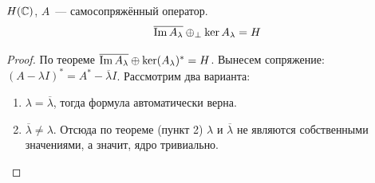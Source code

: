 \begin{theorem}[11.2]\label{11.2}
    $H(\mathbb{C})$, $A$~--- самосопряжённый оператор.
    \[
    \overline{\operatorname{Im} A_{\lambda}} \oplus_{\perp} \ker A_{\lambda} = H
    \]
\end{theorem}

\begin{proof}
    По теореме  $\overline{\operatorname{Im} A_\lambda} \oplus \ker (A_\lambda)^*=H$.
    Вынесем сопряжение: $(A - \lambda I)^* = A^* - \overline{\lambda} I$.
    Рассмотрим два варианта:
    \begin{enumerate}
        \item[$\lambda \in \R\!: $]
        $\lambda = \overline{\lambda}$, тогда формула автоматически верна.
        \item[$\lambda \not\in \R\!: $]
        $\overline{\lambda} \neq \lambda$. Отсюда по теореме  (пункт 2) $\lambda$ и $\overline{\lambda}$
        не являются собственными значениями, а значит, ядро тривиально.
        \end{enumerate}
\end{proof}